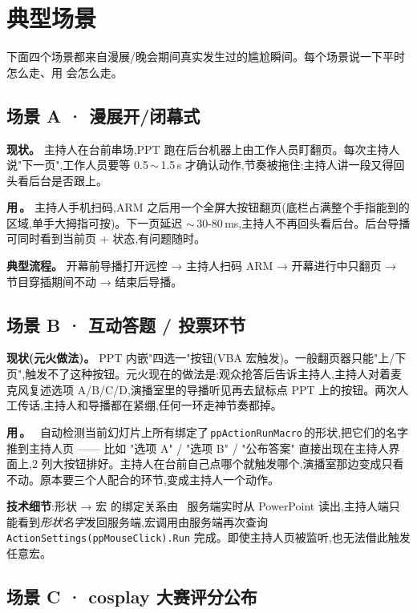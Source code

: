 \section{典型场景}

下面四个场景都来自漫展/晚会期间真实发生过的尴尬瞬间。每个场景说一下平时怎么走、用\,\app\,会怎么走。

\subsection{场景 A · 漫展开/闭幕式}

\textbf{现状。} 主持人在台前串场,PPT 跑在后台机器上由工作人员盯翻页。每次主持人说"下一页",工作人员要等 0.5\,$\sim$\,1.5\,s 才确认动作,节奏被拖住;主持人讲一段又得回头看后台是否跟上。

\textbf{用\,\app。} 主持人手机扫码,ARM 之后用一个全屏大按钮翻页(底栏占满整个手指能到的区域,单手大拇指可按)。下一页延迟 $\sim$\,30-80\,ms,主持人不再回头看后台。后台导播可同时看到当前页 + 状态,有问题随时。

\textbf{典型流程。} 开幕前导播打开远控 → 主持人扫码 ARM → 开幕进行中只翻页 → 节目穿插期间不动 → 结束后导播。

\subsection{场景 B · 互动答题 / 投票环节}

\textbf{现状(元火做法)。} PPT 内嵌"四选一"按钮(VBA 宏触发)。一般翻页器只能"上/下页",触发不了这种按钮。元火现在的做法是:观众抢答后告诉主持人,主持人对着麦克风复述选项 A/B/C/D,演播室里的导播听见再去鼠标点 PPT 上的按钮。两次人工传话,主持人和导播都在紧绷,任何一环走神节奏都掉。

\textbf{用\,\app。} \app\ 自动检测当前幻灯片上所有绑定了\,\texttt{ppActionRunMacro}\,的形状,把它们的名字推到主持人页 —— 比如 "选项 A" / "选项 B" / "公布答案" 直接出现在主持人界面上,2 列大按钮排好。主持人在台前自己点哪个就触发哪个,演播室那边变成只看不动。原本要三个人配合的环节,变成主持人一个动作。

\begin{infobox}
\textbf{技术细节}:形状 → 宏 的绑定关系由 \app\ 服务端实时从 PowerPoint 读出,主持人端只能看到\textit{形状名字}发回服务端,宏调用由服务端再次查询 \texttt{ActionSettings(ppMouseClick).Run} 完成。即使主持人页被监听,也无法借此触发任意宏。
\end{infobox}

\subsection{场景 C · cosplay 大赛评分公布}

